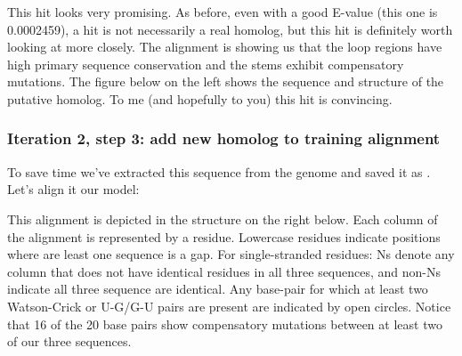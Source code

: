 This hit looks very promising. As before, even with a good E-value
(this one is 0.0002459), a hit is not necessarily a real homolog, but
this hit is definitely worth looking at more closely. The
 alignment is showing us that the loop regions have
high primary sequence conservation and the stems exhibit
compensatory mutations. The figure below on the left shows the
sequence and structure of the putative homolog. To me (and hopefully to you) this
hit is convincing. 

\subsubsection{Iteration 2, step 3: add new homolog to training alignment}
To save time we've extracted this sequence from the genome and saved
it as . Let's align it our model:


This alignment is depicted in the structure on the right
below. Each column of the alignment is represented by a
residue. Lowercase residues indicate positions where are least one
sequence is a gap.  For single-stranded residues: Ns denote any
column that does  not have identical residues in all three sequences,
and non-Ns indicate all three sequence are identical. Any base-pair
for which at least two Watson-Crick or U-G/G-U pairs are present are
indicated by open circles. Notice that 16 of the 20 base pairs show
compensatory mutations between at least two of our three sequences. 

